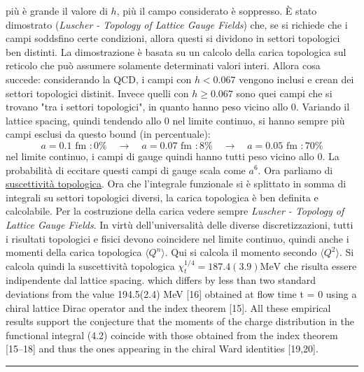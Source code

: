\documentclass[12pt,a4paper,openright]{article}
\newcommand{\la}{\langle}
\newcommand{\ra}{\rangle}
\begin{document}
più è grande il valore di $h$, più il campo considerato è soppresso.
\newline
È stato dimostrato (\textit{Luscher - Topology of Lattice Gauge Fields}) che, se si richiede che i campi soddsfino certe condizioni, allora questi si dividono in settori topologici ben distinti.
La dimostrazione è basata su un calcolo della carica topologica sul reticolo che può assumere solamente determinati valori interi.
Allora cosa succede: considerando la QCD, i campi con $h < 0.067$ vengono inclusi e crean dei settori topologici distinit. Invece quelli con $h \ge 0.067$ sono quei campi che si trovano "tra i settori topologici", in quanto hanno peso vicino allo 0.
Variando il lattice spacing, quindi tendendo allo 0 nel limite continuo, si hanno sempre più campi esclusi da questo bound (in percentuale):
\begin{equation*}
  a = 0.1 \text{ fm }: 0\% \quad \rightarrow \quad a = 0.07 \text{ fm }: 8\% \quad \rightarrow \quad a = 0.05 \text{ fm }: 70\%
\end{equation*}
nel limite continuo, i campi di gauge quindi hanno tutti peso vicino allo 0.
La probabilità di eccitare questi campi di gauge scala come $a^6$.
\newline
Ora parliamo di \underline{suscettività topologica}. Ora che l'integrale funzionale si è splittato in somma di integrali su settori topologici diversi, la carica topologica è ben definita e calcolabile.
Per la costruzione della carica vedere sempre \textit{Luscher - Topology of Lattice Gauge Fields}.
In virtù dell'universalità delle diverse discretizzazioni, tutti i risultati topologici e fisici devono coincidere nel limite continuo, quindi anche i momenti della carica topologica $\la Q^n \ra$.
Qui si calcola il momento secondo $\la Q^2 \ra$. Si calcola quindi la suscettività topologica $\chi_t^{1/4} = 187.4(3.9) \text{MeV}$ che risulta essere indipendente dal lattice spacing.
which differs by less than two standard deviations from the value 194.5(2.4) MeV
[16] obtained at flow time t = 0 using a chiral lattice Dirac operator and the index
theorem [15].
All these empirical results support the conjecture that the moments of the charge
distribution in the functional integral (4.2) coincide with those obtained from the
index theorem [15–18] and thus the ones appearing in the chiral Ward identities
[19,20].
\newline
\hrule
\end{document}
